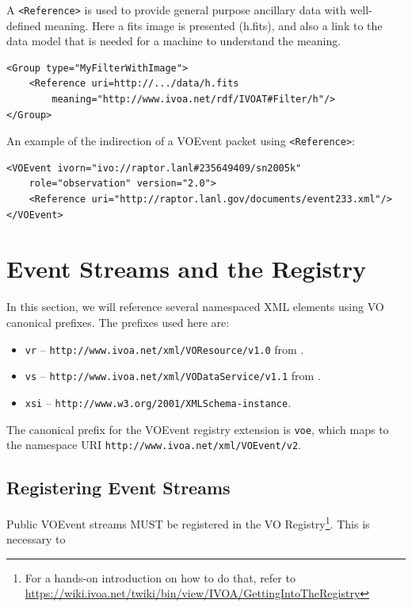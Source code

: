 \documentclass[11pt,a4paper]{ivoa}
\begin{document}
A {\tt <Reference>} is used to provide general purpose ancillary data with well-defined meaning. Here a fits image is presented (h.fits), and also a link to the data model that is needed for a machine to understand the meaning. 
{\footnotesize
\begin{verbatim}
<Group type="MyFilterWithImage">
    <Reference uri=http://.../data/h.fits 
        meaning="http://www.ivoa.net/rdf/IVOAT#Filter/h"/>
</Group> 
\end{verbatim}}
An example of the indirection of a VOEvent packet using {\tt <Reference>}:  
{\footnotesize
\begin{verbatim}
<VOEvent ivorn="ivo://raptor.lanl#235649409/sn2005k" 
    role="observation" version="2.0">   
    <Reference uri="http://raptor.lanl.gov/documents/event233.xml"/>
</VOEvent> 
\end{verbatim}}

\section{Event Streams and the Registry}
\label{sec:registry-matters}

In this section, we will reference several namespaced XML elements using
VO canonical prefixes.  The prefixes used here are:

\begin{itemize}
\item \verb|vr| -- \nolinkurl{http://www.ivoa.net/xml/VOResource/v1.0}
from \citet{2018ivoa.spec.0625P}.
\item \verb|vs| --
\nolinkurl{http://www.ivoa.net/xml/VODataService/v1.1}
from \citet{todo:VODataService-1.2}.
\item \verb|xsi| --
\nolinkurl{http://www.w3.org/2001/XMLSchema-instance}.
\end{itemize}

The canonical prefix for the VOEvent registry extension is \verb|voe|,
which maps to the namespace URI
\nolinkurl{http://www.ivoa.net/xml/VOEvent/v2}.

\subsection{Registering Event Streams}
\label{sec:registering}

Public VOEvent streams MUST be registered in the VO
Registry\footnote{For a hands-on introduction on how to do that, refer
to
\url{https://wiki.ivoa.net/twiki/bin/view/IVOA/GettingIntoTheRegistry}}.
This is necessary to
\end{document}
